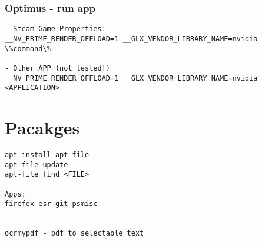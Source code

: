 \documentclass[10pt, a4paper, onecolumn, openany]{book} %
\begin{document}
\subsection{Optimus - run app}
\begin{Verbatim}[commandchars=\\\{\}]
- Steam Game Properties:
__NV_PRIME_RENDER_OFFLOAD=1 __GLX_VENDOR_LIBRARY_NAME=nvidia \%command\%

- Other APP (not tested!)
__NV_PRIME_RENDER_OFFLOAD=1 __GLX_VENDOR_LIBRARY_NAME=nvidia <APPLICATION>
\end{Verbatim}



\chapter{Pacakges}
\begin{Verbatim}[commandchars=\\\{\}]
apt install apt-file
apt-file update
apt-file find <FILE>

Apps:
firefox-esr git psmisc


ocrmypdf - pdf to selectable text

\end{Verbatim}
\end{document}
